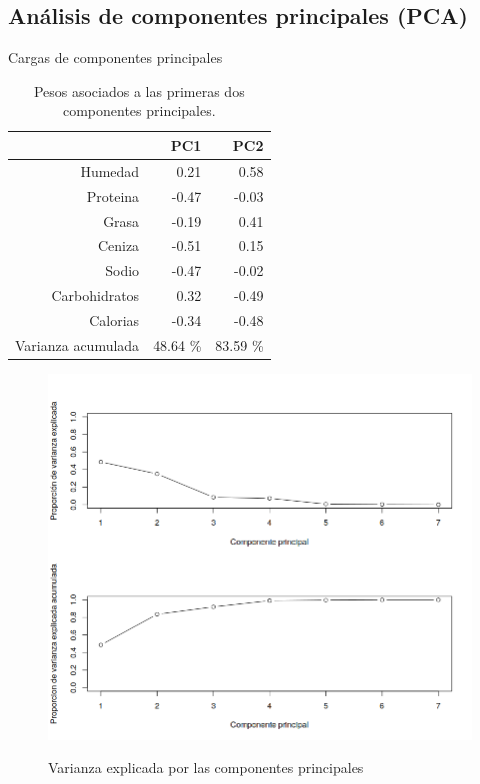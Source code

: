 \documentclass[pdf]{beamer}
\begin{document}
\subsection{Análisis de componentes principales (PCA)}

\begin{frame}{Cargas de componentes principales}
\begin{table}[ht]
\centering
\begin{tabular}{rrr}
  \hline
 & PC1 & PC2 \\ 
  \hline
Humedad & 0.21 & 0.58 \\ 
  Proteina & -0.47 & -0.03 \\ 
  Grasa & -0.19 & 0.41 \\ 
  Ceniza & -0.51 & 0.15 \\ 
  Sodio & -0.47 & -0.02 \\ 
  Carbohidratos & 0.32 & -0.49 \\ 
  Calorias & -0.34 & -0.48 \\ 
  Varianza acumulada & 48.64 \% &  83.59 \% \\ 
\end{tabular}
	\label{tabla:pesos_PCA}
	\caption{Pesos asociados a las primeras dos componentes principales.}
\end{table}
\end{frame}


\begin{frame}
\begin{figure}[h]
\centering
	\includegraphics[scale=.35]{images/varPCA.png} 
	\label{i_var_PCA}
	\caption{Varianza explicada por las componentes principales}
\end{figure}
\end{frame}
\end{document}
